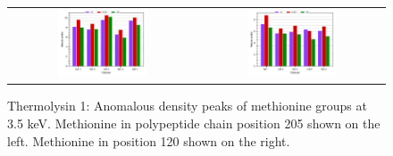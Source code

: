\begin{figure}
    \centering
    \begin{tabular}{cc}
        \includegraphics[width = 0.5\textwidth]{plots/exp1/tlys_9_P6122/peaks/3p5_met250.pdf} & \includegraphics[width = 0.5\textwidth]{plots/exp1/tlys_9_P6122/peaks/3p5_met120.pdf}
    \end{tabular}
    \caption{Thermolysin 1: Anomalous density peaks of methionine groups at 3.5 \unit{keV}. Methionine in polypeptide chain position 205 shown on the left. Methionine in position 120 shown on the right.}
    \label{fig:tlys9_met_peaks_3p5}
\end{figure}

